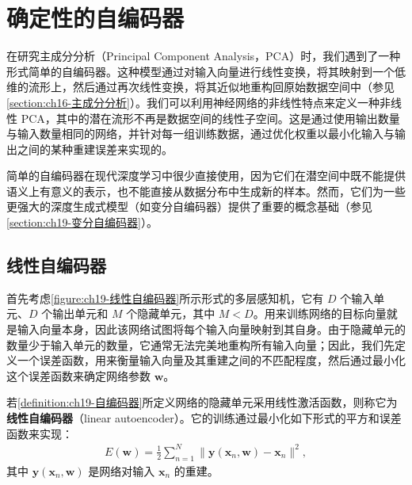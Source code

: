 \documentclass[../../main.tex]{subfiles}
\begin{document}
\section{确定性的自编码器}\label{section:ch19-确定性自编码器}

在研究主成分分析（Principal Component Analysis，PCA）时，我们遇到了一种形式简单的自编码器。这种模型通过对输入向量进行线性变换，将其映射到一个低维的流形上，然后通过再次线性变换，将其近似地重构回原始数据空间中（参见\cref{section:ch16-主成分分析}）。我们可以利用神经网络的非线性特点来定义一种非线性 PCA，其中的潜在流形不再是数据空间的线性子空间。这是通过使用输出数量与输入数量相同的网络，并针对每一组训练数据，通过优化权重以最小化输入与输出之间的某种重建误差来实现的。

简单的自编码器在现代深度学习中很少直接使用，因为它们在潜空间中既不能提供语义上有意义的表示，也不能直接从数据分布中生成新的样本。然而，它们为一些更强大的深度生成式模型（如变分自编码器）提供了重要的概念基础（参见\cref{section:ch19-变分自编码器}）。

\subsection{线性自编码器}\label{subsection:ch19-线性自编码器}

首先考虑\cref{figure:ch19-线性自编码器}所示形式的多层感知机，它有 $D$ 个输入单元、$D$ 个输出单元和 $M$ 个隐藏单元，其中 $M<D$。用来训练网络的目标向量就是输入向量本身，因此该网络试图将每个输入向量映射到其自身。由于隐藏单元的数量少于输入单元的数量，它通常无法完美地重构所有输入向量；因此，我们先定义一个误差函数，用来衡量输入向量及其重建之间的不匹配程度，然后通过最小化这个误差函数来确定网络参数 $\bm{w}$。

\begin{definition}[线性自编码器]\label{definition:ch19-线性自编码器}
若\cref{definition:ch19-自编码器}所定义网络的隐藏单元采用线性激活函数，则称它为\textbf{线性自编码器}（linear autoencoder）。它的训练通过最小化如下形式的平方和误差函数来实现：
\begin{align}
E(\bm{w})=\frac{1}{2}\sum_{n=1}^{N}\big\|\bm{y}(\bm{x}_n,\bm{w})-\bm{x}_n\big\|^{2},
\label{align:ch19-平方和误差}
\end{align}
其中 $\bm{y}(\bm{x}_n,\bm{w})$ 是网络对输入 $\bm{x}_n$ 的重建。
\end{definition}
\end{document}
